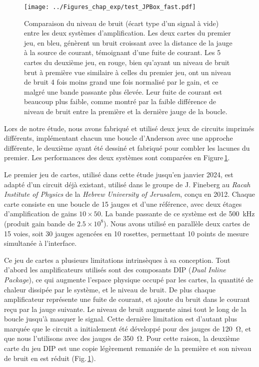 \begin{figure}[htb]
\centering	
\texttt{[image: ../Figures\_chap\_exp/test\_JPBox\_fast.pdf]}
\caption[Niveau de bruit dans nos dispositifs d'amplification]{Comparaison du niveau de bruit (écart type d'un signal à vide) entre les deux systèmes d'amplification. Les deux cartes du premier jeu, en bleu, génèrent un bruit croissant avec la distance de la jauge à la source de courant, témoignant d'une fuite de courant. Les 5 cartes du deuxième jeu, en rouge, bien qu'ayant un niveau de bruit brut à première vue similaire à celles du premier jeu, ont un niveau de bruit 4 fois moins grand une fois normalisé par le gain, et ce malgré une bande passante plus élevée. Leur fuite de courant est beaucoup plus faible, comme montré par la faible différence de niveau de bruit entre la première et la dernière jauge de la boucle.}
\label{fig:bruit}
\end{figure}




Lors de notre étude, nous avons fabriqué et utilisé deux jeux de circuits imprimés différents, implémentant chacun une boucle d'Anderson avec une approche différente, le deuxième ayant été dessiné et fabriqué pour combler les lacunes du premier. Les performances des deux systèmes sont comparées en Figure\,\ref{fig:bruit}.



Le premier jeu de cartes, utilisé dans cette étude jusqu'en janvier 2024, est adapté d'un circuit déjà existant, utilisé dans le groupe de J. Fineberg au \textit{Racah Institute of Physics} de la \textit{Hebrew University of Jerusalem}, conçu en 2012. Chaque carte consiste en une boucle de 15 jauges et d'une référence, avec deux étages d'amplification de gains $10\times50$. La bande passante de ce système est de \SI{500}{\kilo\hertz} (produit gain bande de $2.5\times10^8$). Nous avons utilisé en parallèle deux cartes de 15 voies, soit 30 jauges agencées en 10 rosettes, permettant 10 points de mesure simultanée à l'interface.

Ce jeu de cartes a plusieurs limitations intrinsèques à sa conception. Tout d'abord les amplificateurs utilisés sont des composants DIP (\textit{Dual Inline Package}), ce qui augmente l'espace physique occupé par les cartes, la quantité de chaleur dissipée par le système, et le niveau de bruit. De plus chaque amplificateur représente une fuite de courant, et ajoute du bruit dans le courant reçu par la jauge suivante. Le niveau de bruit augmente ainsi tout le long de la boucle jusqu'à masquer le signal. Cette dernière limitation est d'autant plus marquée que le circuit a initialement été développé pour des jauges de \SI{120}{\ohm}, et que nous l'utilisons avec des jauges de \SI{350}{\ohm}. Pour cette raison, la deuxième carte du jeu DIP est une copie légèrement remaniée de la première et son niveau de bruit en est réduit (Fig.\,\ref{fig:bruit}).



